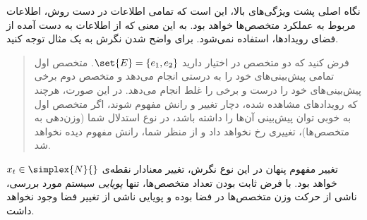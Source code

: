 نگاه اصلی پشت ویژگی‌های بالا، این است که تمامی اطلاعات در دست روش، اطلاعات مربوط به عملکرد متخصص‌ها خواهد بود. به این معنی که از اطلاعات به دست آمده از فضای رویدادها، استفاده نمی‌شود. برای واضح شدن نگرش به یک مثال توجه کنید.
\begin{quote}
فرض کنید که دو متخصص در اختیار دارید 
$\set{E} = \{ e_1, e_2 \}$. 
متخصص اول تمامی پیش‌بینی‌های خود را به درستی انجام می‌دهد و متخصص دوم برخی پیش‌بینی‌های خود را درست و برخی را غلط انجام می‌دهد. در این صورت، هرچند که رویدادهای مشاهده شده، دچار تغییر و رانش مفهوم شوند، اگر متخصص اول به خوبی توان پیش‌بینی آن‌ها را داشته باشد، در نوع استدلال شما (وزن‌دهی به متخصص‌ها)، تغییری رخ نخواهد داد و از منظر شما، رانش مفهوم دیده نخواهد شد.
\end{quote}

تغییر مفهوم پنهان در این نوع نگرش، تغییر معنادار نقطه‌ی 
$x_t \in \simplex{N}{}$ 
خواهد بود. با فرض ثابت بودن تعداد متخصص‌ها، تنها 
\textit{
پویایی
} 
سیستم مورد بررسی، ناشی از حرکت وزن متخصص‌ها در فضا بوده و پویایی ناشی از تغییر فضا وجود نخواهد داشت.







































